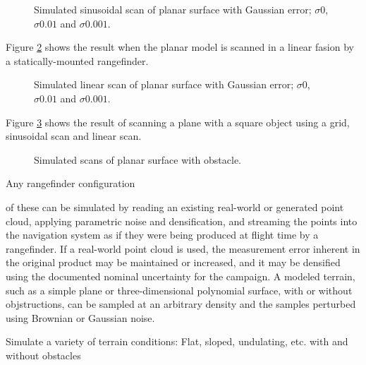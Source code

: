 \documentclass[10pt,a4paper]{report}
\begin{document}
\begin{figure}
\centering
\def\svgscale{0.25}

\def\svgscale{0.25}

\def\svgscale{0.25}

\caption{Simulated sinusoidal scan of planar surface with Gaussian error; $\sigma 0$, $\sigma 0.01$ and $\sigma 0.001$.}
\label{fig:sinus_plane}
\end{figure}


Figure \ref{fig:linear_plane} shows the result when the planar model is scanned in a linear fasion by a statically-mounted rangefinder.

\begin{figure}
\centering
\def\svgscale{0.25}

\def\svgscale{0.25}

\def\svgscale{0.25}

\caption{Simulated linear scan of planar surface with Gaussian error; $\sigma 0$, $\sigma 0.01$ and $\sigma 0.001$.}
\label{fig:linear_plane}
\end{figure}

Figure \ref{fig:plane_object} shows the result of scanning a plane with a square object using a grid, sinusoidal scan and linear scan.

\begin{figure}
\centering
\def\svgscale{0.25}

\def\svgscale{0.25}

\def\svgscale{0.25}

\caption{Simulated scans of planar surface with obstacle.}
\label{fig:plane_object}
\end{figure}


Any rangefinder configuration

of these can be simulated by reading an existing real-world or generated point cloud, applying parametric noise and densification, and streaming the points into the navigation system as if they were being produced at flight time by a rangefinder. If a real-world point cloud is used, the measurement error inherent in the original product may be maintained or increased, and it may be densified using the documented nominal uncertainty for the campaign. A modeled terrain, such as a simple plane or three-dimensional polynomial surface, with or without objstructions, can be sampled at an arbitrary density and the samples perturbed using Brownian or Gaussian noise.

Simulate a variety of terrain conditions: Flat, sloped, undulating, etc. with and without obstacles
\end{document}
